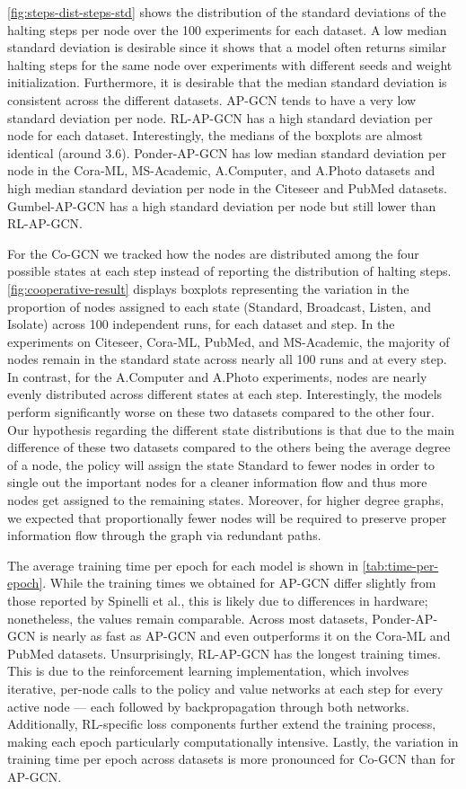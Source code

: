 \documentclass{gdl}
\begin{document}
\autoref{fig:steps-dist-steps-std} shows the distribution of the standard deviations of the halting steps per node over the 100 experiments for each dataset. A low median standard deviation is desirable since it shows that a model often returns similar halting steps for the same node over experiments with different seeds and weight initialization. Furthermore, it is desirable that the median standard deviation is consistent across the different datasets. AP-GCN tends to have a very low standard deviation per node. RL-AP-GCN has a high standard deviation per node for each dataset. Interestingly, the medians of the boxplots are almost identical (around 3.6). Ponder-AP-GCN has low median standard deviation per node in the Cora-ML, MS-Academic, A.Computer, and A.Photo datasets and high median standard deviation per node in the Citeseer and PubMed datasets. Gumbel-AP-GCN has a high standard deviation per node but still lower than RL-AP-GCN. 

For the Co-GCN we tracked how the nodes are distributed among the four possible states at each step instead of reporting the distribution of halting steps. \autoref{fig:cooperative-result} displays boxplots representing the variation in the proportion of nodes assigned to each state (Standard, Broadcast, Listen, and Isolate) across 100 independent runs, for each dataset and step. In the experiments on Citeseer, Cora-ML, PubMed, and MS-Academic, the majority of nodes remain in the standard state across nearly all 100 runs and at every step. In contrast, for the A.Computer and A.Photo experiments, nodes are nearly evenly distributed across different states at each step. Interestingly, the models perform significantly worse on these two datasets compared to the other four. Our hypothesis regarding the different state distributions is that due to the main difference of these two datasets compared to the others being the average degree of a node, the policy will assign the state Standard to fewer nodes in order to single out the important nodes for a cleaner information flow and thus more nodes get assigned to the remaining states. Moreover, for higher degree graphs, we expected that proportionally fewer nodes will be required to preserve proper information flow through the graph via redundant paths.

The average training time per epoch for each model is shown in \autoref{tab:time-per-epoch}. While the training times we obtained for AP-GCN differ slightly from those reported by Spinelli et al., this is likely due to differences in hardware; nonetheless, the values remain comparable. Across most datasets, Ponder-AP-GCN is nearly as fast as AP-GCN and even outperforms it on the Cora-ML and PubMed datasets. Unsurprisingly, RL-AP-GCN has the longest training times. This is due to the reinforcement learning implementation, which involves iterative, per-node calls to the policy and value networks at each step for every active node --- each followed by backpropagation through both networks. Additionally, RL-specific loss components further extend the training process, making each epoch particularly computationally intensive. Lastly, the variation in training time per epoch across datasets is more pronounced for Co-GCN than for AP-GCN.
\end{document}
